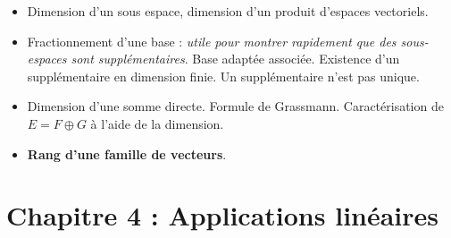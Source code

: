 \documentclass[twoside,a4paper,french,10pt]{VcCours}
\begin{document}
\begin{enumerate}
\begin{itemize}
    \item Dimension d'un sous espace, dimension d'un produit d'espaces vectoriels.
    \item Fractionnement d'une base : \textit{utile pour montrer rapidement que des sous-espaces sont supplémentaires}. Base adaptée associée. Existence d'un supplémentaire en dimension finie. Un supplémentaire n'est pas unique. 
    \item Dimension d'une somme directe. Formule de Grassmann. Caractérisation de $E= F \oplus G$ à l'aide de la dimension.
    \item \textbf{Rang d'une famille de vecteurs}.
    \end{itemize}
\end{enumerate}

\section*{Chapitre 4 : Applications linéaires}
\end{document}
